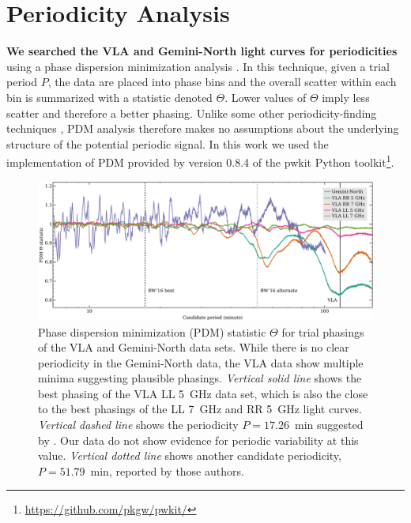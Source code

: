 \documentclass[twocolumn, times]{aastex6}
\begin{document}
\section{Periodicity Analysis}
\label{s.periodicity}

\textbf{We searched the VLA and Gemini-North light curves for periodicities} using a phase
dispersion minimization analysis \citep[PDM;][]{the.pdm}. In this technique,
given a trial period $P$, the data are placed into phase bins and the overall
scatter within each bin is summarized with a statistic denoted $\Theta$. Lower
values of $\Theta$ imply less scatter and therefore a better phasing. Unlike
some other periodicity-finding techniques \citep[e.g., the Lomb-Scargle
  periodogram;][]{l76, s82}, PDM analysis therefore makes no assumptions about
the underlying structure of the potential periodic signal. In this work we
used the implementation of PDM provided by version 0.8.4 of the \textsf{pwkit}
Python toolkit\footnote{\url{https://github.com/pkgw/pwkit/}}.


\begin{figure}[tbp]
  \includegraphics[width=\linewidth]{pdm}
  \caption{Phase dispersion minimization (PDM) statistic $\Theta$ for trial
    phasings of the VLA and Gemini-North data sets. While there is no clear
    periodicity in the Gemini-North data, the VLA data show multiple minima
    suggesting plausible phasings. \textit{Vertical solid line} shows the best
    phasing of the VLA LL 5~GHz data set, which is also the close to the best
    phasings of the LL 7~GHz and RR 5~GHz light curves. \textit{Vertical
      dashed line} shows the periodicity $P = 17.26$~min suggested by
    \citet{rw16}. Our data do not show evidence for periodic variability at
    this value. \textit{Vertical dotted line} shows another candidate
    periodicity, $P = 51.79$~min, reported by those authors.}
  \label{f.pdm}
\end{figure}
\end{document}
